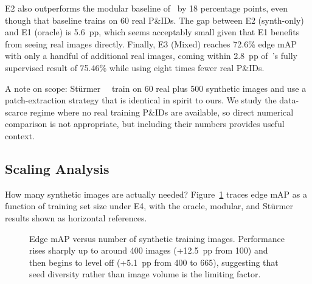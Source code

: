 E2 also outperforms the modular baseline of~\cite{sturmer2025} by
18 percentage points, even though that baseline trains on 60 real
P\&IDs.
The gap between E2 (synth-only) and E1 (oracle) is 5.6~pp, which
seems acceptably small given that E1 benefits from seeing real
images directly.
Finally, E3 (Mixed) reaches 72.6\% edge mAP with only a handful of
additional real images, coming within 2.8~pp of~\cite{sturmer2025}'s
fully supervised result of 75.46\% while using eight times fewer
real P\&IDs.

A note on scope: Stürmer~\etal~\cite{sturmer2025} train on 60 real
plus 500 synthetic images and use a patch-extraction strategy that
is identical in spirit to ours.
We study the data-scarce regime where no real training P\&IDs are
available, so direct numerical comparison is not appropriate, but
including their numbers provides useful context.

\subsection{Scaling Analysis}
\label{sec:exp:scaling}

How many synthetic images are actually needed?
Figure~\ref{fig:scale_ablation} traces edge mAP as a function of
training set size under E4, with the oracle, modular, and Stürmer
results shown as horizontal references.

\begin{figure}[t]
    \centering
    \caption{
        Edge mAP versus number of synthetic training images.
        Performance rises sharply up to around 400 images
        (+12.5~pp from 100) and then begins to level off
        (+5.1~pp from 400 to 665), suggesting that seed diversity
        rather than image volume is the limiting factor.
    }
    \label{fig:scale_ablation}
\end{figure}


